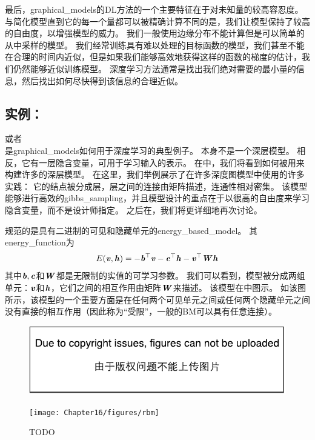 最后，\gls{graphical_models}的\gls{DL}方法的一个主要特征在于对未知量的较高容忍度。
与简化模型直到它的每一个量都可以被精确计算不同的是，我们让模型保持了较高的自由度，以增强模型的威力。
我们一般使用边缘分布不能计算但是可以简单的从中采样的模型。
我们经常训练具有难以处理的目标函数的模型，我们甚至不能在合理的时间内近似，但是如果我们能够高效地获得这样的函数的梯度的估计，我们仍然能够近似训练模型。
深度学习方法通常是找出我们绝对需要的最小量的信息，然后找出如何尽快得到该信息的合理近似。



\subsection{实例：}
\label{sec:example_the_restricted_boltzmann_machine}
\citep{Smolensky86}或者\\ 是\gls{graphical_models}如何用于深度学习的典型例子。 
本身不是一个深层模型。 
相反，它有一层隐含变量，可用于学习输入的表示。 
在中，我们将看到如何被用来构建许多的深层模型。
在这里，我们举例展示了在许多深度图模型中使用的许多实践：
它的结点被分成层，层之间的连接由矩阵描述，连通性相对密集。
该模型能够进行高效的\gls{gibbs_sampling}，并且模型设计的重点在于以很高的自由度来学习隐含变量，而不是设计师指定。
之后在，我们将更详细地再次讨论。

规范的是具有二进制的可见和隐藏单元的\gls{energy_based_model}。 其\gls{energy_function}为
\begin{align}
\label{eqn:1610}
E(\boldsymbol{\mathit{v}},\boldsymbol{\mathit{h}}) = -\boldsymbol{\mathit{b}}^{\top}\boldsymbol{\mathit{v}} - \boldsymbol{\mathit{c}}^{\top}\boldsymbol{\mathit{h}} - \boldsymbol{\mathit{v}}^{\top}\boldsymbol{\mathit{W}}\boldsymbol{\mathit{h}}
\end{align}
其中$\boldsymbol{\mathit{b}},\boldsymbol{\mathit{c}}$和$\boldsymbol{\mathit{W}}$都是无限制的实值的可学习参数。
我们可以看到，模型被分成两组单元：$\boldsymbol{\mathit{v}}$和$\boldsymbol{\mathit{h}}$，它们之间的相互作用由矩阵$\boldsymbol{\mathit{W}}$来描述。
该模型在中图示。
如该图所示，该模型的一个重要方面是在任何两个可见单元之间或任何两个隐藏单元之间没有直接的相互作用（因此称为``受限''，一般的\gls{BM}可以具有任意连接）。



\begin{figure}[!htb]
\ifOpenSource
\centerline{\includegraphics{figure.pdf}}
\else
	\centerline{\texttt{[image: Chapter16/figures/rbm]}}	
\fi
	\caption{TODO}
	\label{fig:rbm}
\end{figure}



